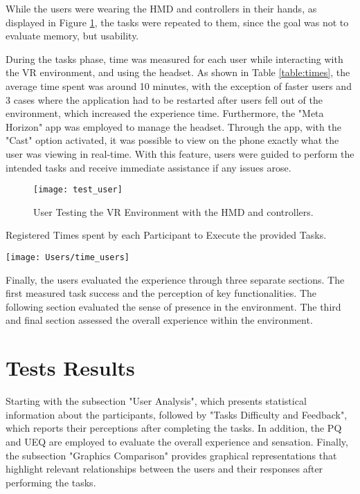 While the users were wearing the \gls{HMD} and controllers in their hands, as displayed in Figure \ref{fig:user}, the tasks were repeated to them, since the goal was not to evaluate memory, but usability.

During the tasks phase, time was measured for each user while interacting with the \gls{VR} environment, and using the headset. 
As shown in Table \ref{table:times}, the average time spent was around 10 minutes, with the exception of faster users and 3 cases where the application had to be restarted after users fell out of the environment, which increased the experience time.
Furthermore, the "Meta Horizon" app was employed to manage the headset. Through the app, with the "Cast" option activated, it was possible to view on the phone exactly what the user was viewing in real-time. 
With this feature, users were guided to perform the intended tasks and receive immediate assistance if any issues arose. 

\begin{figure}[h!]
    \centering
    \texttt{[image: test\_user]}
    \caption{User Testing the \gls{VR} Environment with the \gls{HMD} and controllers.} 
    \label{fig:user}
\end{figure}

\begin{table}[h!]
    \caption{Registered Times spent by each Participant to Execute the provided Tasks.} 
    \centering
    \texttt{[image: Users/time\_users]}
    \label{table:times}
\end{table}

Finally, the users evaluated the experience through three separate sections. The first measured task success and the perception of key functionalities.
The following section evaluated the sense of presence in the environment. The third and final section assessed the overall experience within the environment.



\section{Tests Results}
\label{sec:results}

Starting with the subsection "User Analysis", which presents statistical information about the participants, followed by "Tasks Difficulty and Feedback", which reports their perceptions after completing the tasks.
In addition, the \gls{PQ} and \gls{UEQ} are employed to evaluate the overall experience and sensation. Finally, the subsection "Graphics Comparison" provides graphical representations that highlight relevant relationships between the users and their responses after performing the tasks.
